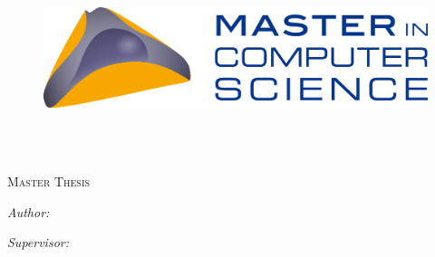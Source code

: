 \documentclass[
11pt, %
english, %
singlespacing, %
headsepline, %
chapterinoneline, %
]{MastersDoctoralThesis} %
\author{Roberto G. \textsc{Sánchez A.}} %
\begin{document}
%


\dominitoc
\frontmatter %

\pagestyle{plain} %


\begin{titlepage}
\begin{figure}
        \centering
                \includegraphics[width=.3\textwidth,valign=t]{Pic/MSc_quer.png}
\end{figure}
\begin{center}

\HRule \\[0.2cm] %
{\huge \bfseries \ttitle\par}\vspace{0.4cm} %
\HRule \\[0.2cm] %


\textsc{\Large Master Thesis}\\[0.5cm] %
\vspace*{.06\textheight}

 
\begin{minipage}[t]{0.35\textwidth}
\begin{flushleft} \large
\emph{Author:}\\
\href{http://}{\authorname}\footnotemark 
\end{flushleft}
\end{minipage} 
\begin{minipage}[t]{0.35\textwidth}
\begin{flushright} \large
\emph{Supervisor:} \\
\href{http://human-ist.unifr.ch/team/julien-nembrini}{\supname} \footnotemark 
\end{flushright} 
\end{minipage}
\\[0.8cm]


\end{center}
\end{titlepage}
\end{document}
